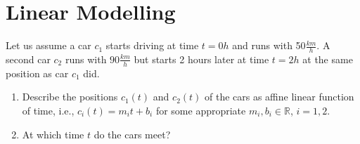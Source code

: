 \section{Linear Modelling}
Let us assume a car $c_1$ starts driving at time $t=0h$ and runs with 50$\frac{km}{h}$. A second car $c_2$ runs with $90\frac{km}{h}$ but starts 2 hours later at time $t=2h$ at the same position as car $c_1$ did.
\begin{enumerate}
	\item Describe the positions $c_1(t)$ and $c_2(t)$ of the cars as affine linear function of time, i.e., $c_i(t) = m_i t + b_i$ for some appropriate $m_i, b_i \in \mathbb{R}$, $i = 1,2$.
	\item At which time $t$ do the cars meet? 
\end{enumerate}